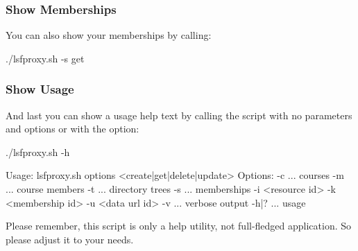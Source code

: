 \subsubsection{Show Memberships}
You can also show your memberships by calling:
\begin{code}
  ./lsfproxy.sh -s get
\end{code}

\subsubsection{Show Usage}
And last you can show a usage help text by calling the script with no
parameters and options or with the  option:
\begin{code}
  ./lsfproxy.sh -h

  Usage: lsfproxy.sh options <create|get|delete|update>
  Options:
    -c ... courses
    -m ... course members
    -t ... directory trees
    -s ... memberships
    -i <resource id>
    -k <membership id>
    -u <data url id>
    -v   ... verbose output
    -h|? ... usage
\end{code}
Please remember, this script is only a help utility, not full-fledged
application. So please adjust it to your needs. 

